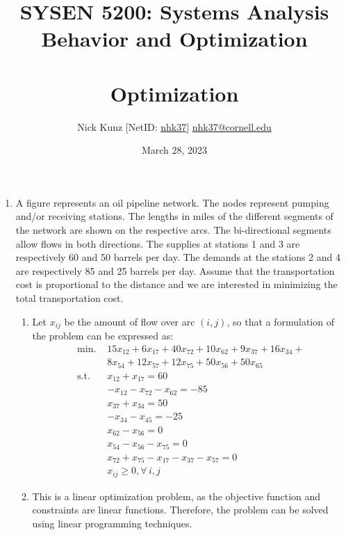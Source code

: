 \documentclass{article}
\begin{document}
\title{SYSEN 5200: Systems Analysis Behavior and Optimization\\~\\
    \Large Optimization
}
\author{
    Nick Kunz [NetID: \url{nhk37}] \hyperlink{nhk37@cornell.edu}{nhk37@cornell.edu}}
\date{March 28, 2023}
\maketitle
\thispagestyle{fancy}

\begin{enumerate}

    \item A figure represents an oil pipeline network. The nodes represent pumping and/or receiving stations. The lengths in miles of the different segments of the network are shown on the respective arcs. The bi-directional segments allow flows in both directions. The supplies at stations 1 and 3 are respectively 60 and 50 barrels per day. The demands at the stations 2 and 4 are respectively 85 and 25 barrels per day. Assume that the transportation cost is proportional to the distance and we are interested in minimizing the total transportation cost.

    \begin{enumerate}
        \item Let $x_{ij}$ be the amount of flow over arc $(i,j)$, so that a formulation of the problem can be expressed as:
        \begin{equation}
            \begin{split}
                \text{min. } & 15x_{12} + 6x_{17} + 40x_{72} + 10x_{62} + 9x_{37} + 16x_{34} + \\
                & 8x_{54} + 12x_{57} + 12x_{75} + 50x_{56} + 50x_{65} \\
                \text{s.t. }
                & x_{12} + x_{17} = 60 \\
                & -x_{12} - x_{72} - x_{62} = -85 \\
                & x_{37} + x_{34} = 50 \\
                & -x_{34} - x_{45} = -25 \\
                & x_{62} - x_{56} = 0 \\
                & x_{54} - x_{56} - x_{75} = 0 \\
                & x_{72} + x_{75} - x_{17} - x_{37} - x_{57} = 0 \\
                & x_{ij} \geq 0, \forall \, i,j
            \end{split}
        \end{equation}
        \item This is a linear optimization problem, as the objective function and constraints are linear functions. Therefore, the problem can be solved using linear programming techniques.
    \end{enumerate}\\


\end{enumerate}
\end{document}
